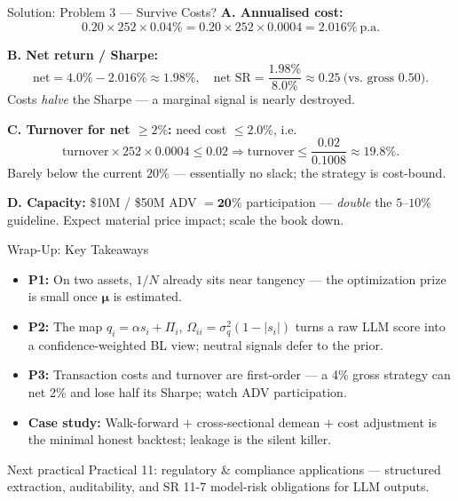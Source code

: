 \documentclass[9pt,t]{beamer}
\begin{document}
\begin{frame}{Solution: Problem 3 --- Survive Costs?}
\textbf{A. Annualised cost:}
\[
0.20\times252\times0.04\%=0.20\times252\times0.0004=\mathbf{2.016\%}\ \text{p.a.}
\]

\textbf{B. Net return / Sharpe:}
\[
\text{net}=4.0\%-2.016\%\approx\mathbf{1.98\%},\quad
\text{net SR}=\frac{1.98\%}{8.0\%}\approx\mathbf{0.25}\ \text{(vs.\ gross }0.50).
\]
Costs \emph{halve} the Sharpe --- a marginal signal is nearly destroyed.

\medskip
\textbf{C. Turnover for net $\ge2\%$:} need cost $\le 2.0\%$, i.e.
\[
\text{turnover}\times252\times0.0004\le0.02
\Rightarrow \text{turnover}\le\frac{0.02}{0.1008}\approx\mathbf{19.8\%}.
\]
Barely below the current $20\%$ --- essentially no slack; the strategy is cost-bound.

\medskip
\textbf{D. Capacity:} \$10M / \$50M ADV $=\mathbf{20\%}$ participation ---
\emph{double} the $5$--$10\%$ guideline. Expect material price impact; scale the book down.
\end{frame}

\begin{frame}{Wrap-Up: Key Takeaways}
\begin{itemize}
  \item \textbf{P1:} On two assets, $1/N$ already sits near tangency --- the optimization
        prize is small once $\boldsymbol{\mu}$ is estimated.
  \item \textbf{P2:} The map $q_i=\alpha s_i+\Pi_i$, $\Omega_{ii}=\sigma_q^2(1-|s_i|)$
        turns a raw LLM score into a confidence-weighted BL view; neutral signals defer to the prior.
  \item \textbf{P3:} Transaction costs and turnover are first-order --- a 4\% gross
        strategy can net 2\% and lose half its Sharpe; watch ADV participation.
  \item \textbf{Case study:} Walk-forward $+$ cross-sectional demean $+$ cost adjustment
        is the minimal honest backtest; leakage is the silent killer.
\end{itemize}

\medskip
\begin{block}{Next practical}
Practical 11: regulatory \& compliance applications --- structured extraction, auditability,
and SR 11-7 model-risk obligations for LLM outputs.
\end{block}
\end{frame}
\end{document}
